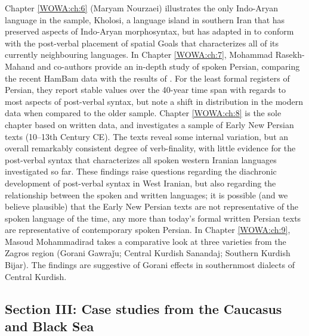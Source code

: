 \documentclass[output=paper,colorlinks,citecolor=brown,collectionchapter]{langscibook}
\begin{document}
Chapter \ref{WOWA:ch:6} (Maryam Nourzaei) illustrates the only Indo-Aryan language in the sample, Kholosi, a language island in southern Iran that has preserved aspects of Indo-Aryan morphosyntax, but has adapted in  to conform with the post-verbal placement of spatial Goals that characterizes all of its currently neighbouring languages. In Chapter \ref{WOWA:ch:7}, Mohammad Rasekh-Mahand and co-authors provide an in-depth study of spoken Persian, comparing the recent HamBam data with the results of \citet{frommer_post-verbal_1981}. For the least formal registers of Persian, they report stable values over the 40-year time span with regards to most aspects of post-verbal syntax, but note a shift in  distribution in the modern data when compared to the older sample. Chapter \ref{WOWA:ch:8} is the sole chapter based on written data, and investigates a sample of Early New Persian texts (10--13th Century CE). The texts reveal some internal variation, but an overall remarkably consistent degree of verb-finality, with little evidence for the post-verbal syntax that characterizes all spoken western Iranian languages investigated so far. These findings raise questions regarding the diachronic development of post-verbal syntax in West Iranian, but also regarding the relationship between the spoken and written languages; it is possible (and we believe plausible) that the Early New Persian texts are not representative of the spoken language of the time, any more than today's formal written Persian texts are representative of contemporary spoken Persian. In Chapter \ref{WOWA:ch:9}, Masoud Mohammadirad takes a comparative look at three varieties from the Zagros region (Gorani Gawraǰu; Central
Kurdish Sanandaj; Southern Kurdish Bijar). The findings are suggestive of Gorani  effects in southernmost dialects of Central Kurdish. 

\subsection{Section III: Case studies from the Caucasus and Black Sea}
\end{document}
